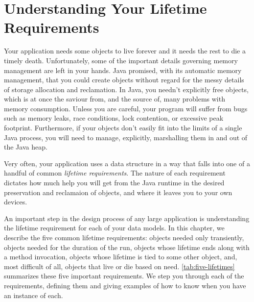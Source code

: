 \chapter{Understanding Your Lifetime Requirements}

Your application needs some objects to live forever and it needs the rest to die
a timely death. Unfortunately, some of the important details governing memory
management are left in your hands. Java promised, with its automatic memory
management, that you could create objects without regard for the messy details of
storage allocation and reclamation. In Java, you needn't explicitly free objects,
which is at once the saviour from, and the source of, many problems with memory
consumption. Unless you are careful, your program will suffer from bugs such as
memory leaks, race conditions, lock contention, or excessive
peak footprint. Furthermore, if your objects don't easily fit into the limits of
a single Java process, you will need to manage, explicitly, marshalling them in
and out of the Java heap.

Very often, your application uses a data structure in a way that falls into one
of a handful of common \emph{lifetime requirements}. The
nature of each requirement dictates how much help you will get from the Java runtime
in the desired preservation and reclamaion of objects, and where it leaves you to
your own devices. 

An important step in the design process of any large application is understanding
the lifetime requirement for each of your data models. In this chapter, we
describe the five common lifetime requirements: objects needed only transiently,
objects needed for the duration of the run, objects whose lifetime ends along
with a method invocation, objects whose lifetime is tied to some other object,
and, most difficult of all, objects that live or die based on need.
\autoref{tab:five-lifetimes} summarizes these five important requirements. We step
you through each of the requirements, defining them and giving examples of how to
know when you have an instance of each.


